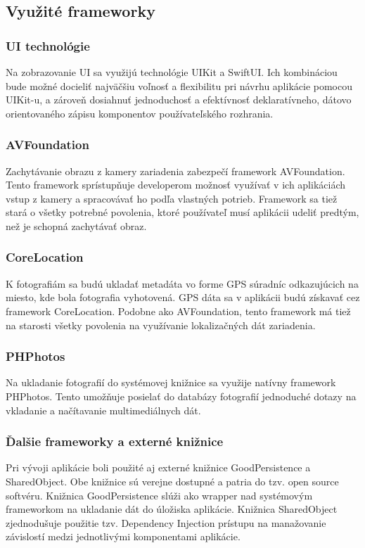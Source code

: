 \documentclass[11pt]{article} %
\begin{document}
\subsection{Využité frameworky}
\subsubsection{UI technológie}
Na zobrazovanie UI sa využijú technológie UIKit a SwiftUI. Ich kombináciou bude možné docieliť najväčšiu voľnosť a flexibilitu pri návrhu aplikácie pomocou UIKit-u, a zároveň dosiahnuť jednoduchosť a efektívnosť deklaratívneho, dátovo orientovaného zápisu komponentov používateľského rozhrania.\\
\subsubsection{AVFoundation}
Zachytávanie obrazu z kamery zariadenia zabezpečí framework AVFoundation. Tento framework sprístupňuje developerom možnosť využívať v ich aplikáciách vstup z kamery a spracovávať ho podľa vlastných potrieb. Framework sa tiež stará o všetky potrebné povolenia, ktoré používateľ musí aplikácii udeliť predtým, než je schopná zachytávať obraz.\\
\subsubsection{CoreLocation}
K fotografiám sa budú ukladať metadáta vo forme GPS súradníc odkazujúcich na miesto, kde bola fotografia vyhotovená. GPS dáta sa v aplikácii budú získavať cez framework CoreLocation. Podobne ako AVFoundation, tento framework má tiež na starosti všetky povolenia na využívanie lokalizačných dát zariadenia.\\
\subsubsection{PHPhotos}
Na ukladanie fotografií do systémovej knižnice sa využije natívny framework PHPhotos. Tento umožňuje posielať do databázy fotografií jednoduché dotazy na vkladanie a načítavanie multimediálnych dát.\\
\subsubsection{Ďalšie frameworky a externé knižnice}
Pri vývoji aplikácie boli použité aj externé knižnice GoodPersistence a SharedObject. Obe knižnice sú verejne dostupné a patria do tzv. open source softvéru. Knižnica GoodPersistence slúži ako wrapper nad systémovým frameworkom na ukladanie dát do úložiska aplikácie. Knižnica SharedObject zjednodušuje použitie tzv. Dependency Injection prístupu na manažovanie závislostí medzi jednotlivými komponentami aplikácie.\\
\end{document}
